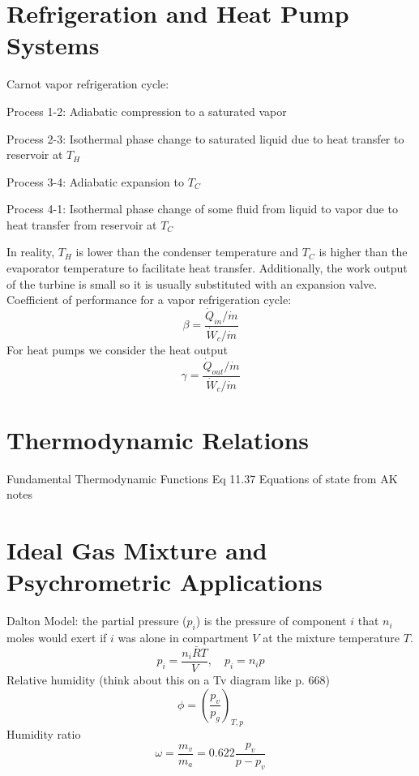 \documentclass[paper=letter, fontsize=11pt]{scrartcl}
\numberwithin{equation}{section}        %
\numberwithin{figure}{section}          %
\numberwithin{table}{section}               %
\begin{document}
\newpage
\section{Refrigeration and Heat Pump Systems}

Carnot vapor refrigeration cycle:

Process 1-2: Adiabatic compression to a saturated vapor

Process 2-3: Isothermal phase change to saturated liquid due to heat transfer to reservoir at $T_H$

Process 3-4: Adiabatic expansion to $T_C$

Process 4-1: Isothermal phase change of some fluid from liquid to vapor due to heat transfer from reservoir at $T_C$

In reality, $T_H$ is lower than the condenser temperature and $T_C$ is higher than the evaporator temperature to facilitate heat transfer. Additionally, the work output of the turbine is small so it is usually substituted with an expansion valve.
\newline
\newline
Coefficient of performance for a vapor refrigeration cycle:
\begin{equation}
    \beta = \frac{\dot Q_{in}/\dot m}{\dot W_c/\dot m}
\end{equation}
\newline
\newline
For heat pumps we consider the heat output
\begin{equation}
    \gamma = \frac{\dot Q_{out}/\dot m}{\dot W_c/\dot m}
\end{equation}

\newpage
\section{Thermodynamic Relations}

Fundamental Thermodynamic Functions Eq 11.37
Equations of state from AK notes


\newpage
\section{Ideal Gas Mixture and Psychrometric Applications}

Dalton Model: the partial pressure ($p_i$) is the pressure of component $i$ that $n_i$ moles would exert if $i$ was alone in compartment $V$ at the mixture temperature $T$.
\begin{equation}
    p_i = \frac{n_i\bar R T}{V},\quad p_i = n_i p
\end{equation}
\newline
\newline
Relative humidity (think about this on a Tv diagram like p. 668)
\begin{equation}
    \phi = \left(\frac{p_v}{p_g}\right)_{T,p}
\end{equation}
\newline
\newline
Humidity ratio
\begin{equation}
    \omega = \frac{m_v}{m_a} = 0.622\frac{p_v}{p-p_v}
\end{equation}
\end{document}

